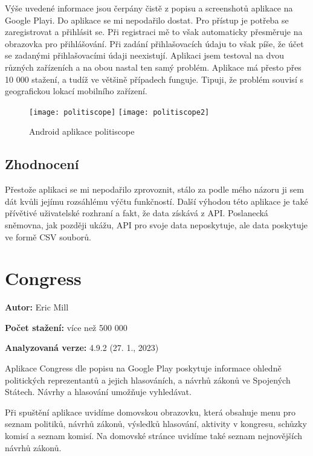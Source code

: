 Výše uvedené informace jsou čerpány čistě z popisu a screenshotů aplikace na Google Playi. Do aplikace se mi nepodařilo dostat. Pro přístup je potřeba se zaregistrovat a přihlásit se. Při registraci mě to však automaticky přesměruje na obrazovka pro přihlášování. Při zadání přihlašovacích údaju to však píše, že účet se zadanými přihlašovacími údaji neexistují. Aplikaci jsem testoval na dvou různých zařízeních a na obou nastal ten samý problém. Aplikace má přesto přes 10 000 stažení, a tudíž ve většině případech funguje. Tipuji, že problém souvisí s geografickou lokací mobilního zařízení.

\begin{figure}
	\centering

	\texttt{[image: politiscope]}
	\texttt{[image: politiscope2]}
	
	\caption{Android aplikace politiscope}
	\label{fig:politoscope}
\end{figure}

\subsection{Zhodnocení}
Přestože aplikaci se mi nepodařilo zprovoznit, stálo za podle mého názoru ji sem dát kvůli jejímu rozsáhlému výčtu funkčností. Další výhodou této aplikace je také přívětivé uživatelské rozhraní a fakt, že data získává z API. Poslanecká sněmovna, jak později ukážu, API pro svoje data neposkytuje, ale data poskytuje ve formě CSV souborů.

\section{Congress}

\begin{description}
	\item \textbf{Autor:} Eric Mill
	\item \textbf{Počet stažení:} více než 500 000
	\item \textbf{Analyzovaná verze:} 4.9.2 (27. 1., 2023)
\end{description}

Aplikace Congress \cite{congress} dle popisu na Google Play poskytuje informace ohledně politických reprezentantů a jejich hlasováních, a návrhů zákonů ve Spojených Státech. Návrhy a hlasování umožňuje vyhledávat.

Při spuštění aplikace uvidíme domovskou obrazovku, která obsahuje menu pro seznam politiků, návrhů zákonů, výsledků hlasování, aktivity v kongresu, schůzky komisí a seznam komisí. Na domovské stránce uvidíme také seznam nejnovějších návrhů zákonů. 

